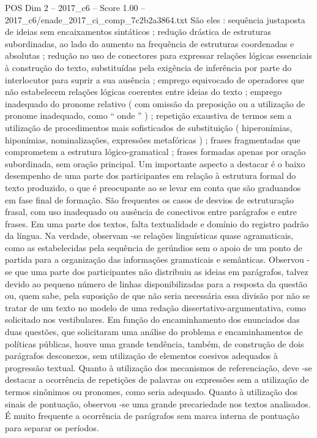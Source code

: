 \begin{textsample}{POS Dim 2 – 2017\_c6 – Score 1.00 – 2017\_c6/enade\_2017\_ci\_comp\_7c2b2a3864.txt}
São eles : sequência justaposta de ideias sem encaixamentos sintáticos ; redução drástica de estruturas subordinadas, ao lado do aumento na frequência de estruturas coordenadas e absolutas ; redução no uso de conectores para expressar relações lógicas essenciais à construção do texto, substituídas pela exigência de inferência por parte do interlocutor para suprir a sua ausência ; emprego equivocado de operadores que não estabelecem relações lógicas coerentes entre ideias do texto ; emprego inadequado do pronome relativo ( com omissão da preposição ou a utilização de pronome inadequado, como “ onde ” ) ; repetição exaustiva de termos sem a utilização de procedimentos mais sofisticados de substituição ( hiperonímias, hiponímias, nominalizações, expressões metafóricas ) ; frases fragmentadas que comprometem a estrutura lógico-gramatical ; frases formadas apenas por oração subordinada, sem oração principal.
Um importante aspecto a destacar é o baixo desempenho de uma parte dos participantes em relação à estrutura formal do texto produzido, o que é preocupante ao se levar em conta que são graduandos em fase final de formação.
São frequentes os casos de desvios de estruturação frasal, com uso inadequado ou ausência de conectivos entre parágrafos e entre frases.
Em uma parte dos textos, falta textualidade e domínio do registro padrão da língua.
Na verdade, observam -se relações linguísticas quase agramaticais, como as estabelecidas pela sequência de gerúndios sem o apoio de um ponto de partida para a organização das informações gramaticais e semânticas.
Observou -se que uma parte dos participantes não distribuiu as ideias em parágrafos, talvez devido ao pequeno número de linhas disponibilizadas para a resposta da questão ou, quem sabe, pela suposição de que não seria necessária essa divisão por não se tratar de um texto no modelo de uma redação dissertativo-argumentativa, como solicitado nos vestibulares.
Em função do encaminhamento dos enunciados das duas questões, que solicitaram uma análise do problema e encaminhamentos de políticas públicas, houve uma grande tendência, também, de construção de dois parágrafos desconexos, sem utilização de elementos coesivos adequados à progressão textual.
Quanto à utilização dos mecanismos de referenciação, deve -se destacar a ocorrência de repetições de palavras ou expressões sem a utilização de termos sinônimos ou pronomes, como seria adequado.
Quanto à utilização dos sinais de pontuação, observou -se uma grande precariedade nos textos analisados.
É muito frequente a ocorrência de parágrafos sem marca interna de pontuação para separar os períodos.

\end{textsample}
